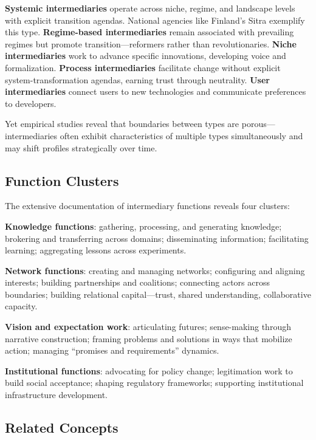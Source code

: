 \documentclass[../main.tex]{subfiles}
\begin{document}
\textbf{Systemic intermediaries} operate across niche, regime, and landscape levels with explicit transition agendas. National agencies like Finland's Sitra exemplify this type. \textbf{Regime-based intermediaries} remain associated with prevailing regimes but promote transition---reformers rather than revolutionaries. \textbf{Niche intermediaries} work to advance specific innovations, developing voice and formalization. \textbf{Process intermediaries} facilitate change without explicit system-transformation agendas, earning trust through neutrality. \textbf{User intermediaries} connect users to new technologies and communicate preferences to developers.

Yet empirical studies reveal that boundaries between types are porous---intermediaries often exhibit characteristics of multiple types simultaneously and may shift profiles strategically over time.

\subsection{Function Clusters}

The extensive documentation of intermediary functions reveals four clusters:

\textbf{Knowledge functions}: gathering, processing, and generating knowledge; brokering and transferring across domains; disseminating information; facilitating learning; aggregating lessons across experiments.

\textbf{Network functions}: creating and managing networks; configuring and aligning interests; building partnerships and coalitions; connecting actors across boundaries; building relational capital---trust, shared understanding, collaborative capacity.

\textbf{Vision and expectation work}: articulating futures; sense-making through narrative construction; framing problems and solutions in ways that mobilize action; managing ``promises and requirements'' dynamics.

\textbf{Institutional functions}: advocating for policy change; legitimation work to build social acceptance; shaping regulatory frameworks; supporting institutional infrastructure development.


\subsection{Related Concepts}
\end{document}
